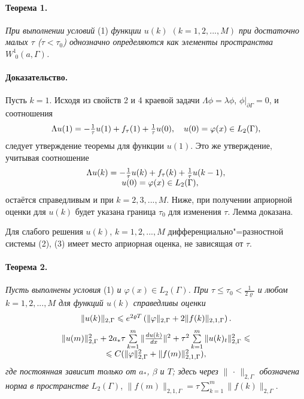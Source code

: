 \paragraph{Теорема 1.} \emph{При выполнении условий }(1) \emph{функции $u(k)$  $(k=1,2,...,M)$ при достаточно малых $\tau$ ($\tau<\tau_0$) однозначно определяются как элементы пространства $W^1_{\,\,0}(a,\Gamma)$.}

\paragraph{Доказательство.}
Пусть $k=1$. Исходя из свойств  2 и 4 краевой задачи ${\Lambda}\phi=\lambda \phi$, $\phi|_{\partial\Gamma}=0$, и соотношения
\[
{{\begin{array}{*{20}c}
{\Lambda}u(1)=-\frac{1}{\tau}u(1)+f_\tau(1)+\frac{1}{\tau}u(0),\quad u(0)=\varphi(x)\in L_2(\Gamma),
\end{array} }}
\]
следует утверждение теоремы для функции $u(1)$. Это\linebreak
же утверждение, учитывая соотношение
\[
{{\begin{array}{*{20}c}
{\Lambda}u(k)=-\frac{1}{\tau}u(k)+f_\tau(k)+\frac{1}{\tau}u(k-1),\\
\quad u(0)=\varphi(x)\in L_2(\Gamma),
\end{array} }}
\]
остаётся справедливым и при $k=2,3,...,M$. Ниже, при получении априорной оценки для $u(k)$ будет указана граница $\tau_0$ для изменения $\tau$. Лемма доказана.


Для слабого решения $u(k)$, $k=1,2,...,M$ дифференциально"=разностной системы (2), (3) имеет место априорная оценка, не зависящая от $\tau$.

\paragraph{Теорема 2.} \emph{Пусть выполнены условия} (1) \emph{и $\varphi(x)\in L_2(\Gamma)$. При  $\tau\leqslant \tau_0<\frac{1}{2\varrho}$ и любом $k=1,2,...,M$ для функций $u(k)$ справедливы оценки}
\begin{equation}\label{eq4}
{{\begin{array}{*{20}c}
\|u(k)\|_{2,\Gamma}\leqslant e^{2\varrho T}\left(\|\varphi\|_{2,\Gamma}+2\|f(k)\|_{2,1,\Gamma}\right).
\end{array} }}
\end{equation}
\begin{equation}\label{eq5}
{{\begin{array}{*{20}c}
\|u(m)\|^2_{2,\Gamma}+2a_*\tau\sum\limits_{k=1}^m\|\frac{du(k)}{dx}\|^2 +\tau^2\sum\limits_{k=1}^m\|u(k)_t\|^2_{2,\Gamma}\leqslant\\
\leqslant C(\|\varphi\|^2_{2,\Gamma} + \|f(m)\|^2_{2,1,\Gamma}),
\end{array} }}
\end{equation}
\emph{где постоянная зависит только от $a_*$, $\beta$ и $T$; здесь через $\|\,\cdot\,\|_{2,\Gamma}$ обозначена норма в пространстве} $L_2(\Gamma)$, $\|f(m)\|_{2,1,\Gamma}=\tau\sum\limits_{k=1}^m \|f(k)\|_{2,\Gamma}$.

